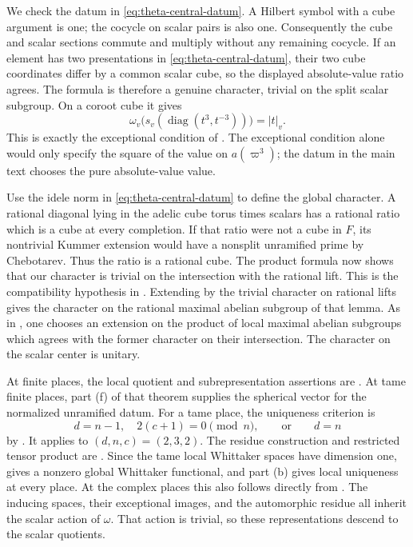 We check the datum in \eqref{eq:theta-central-datum}.  A Hilbert symbol with
a cube argument is one; the cocycle on scalar pairs is also one.  Consequently
the cube and scalar sections commute and multiply without any remaining
cocycle.  If an element has two presentations in
\eqref{eq:theta-central-datum}, their two cube coordinates differ by a
common scalar cube, so the displayed absolute-value ratio agrees.  The
formula is therefore a genuine character, trivial on the split scalar
subgroup.  On a coroot cube it gives
\[
 \omega_v\bigl(s_v(\operatorname{diag}(t^3,t^{-3}))\bigr)=|t|_v.
\]
This is exactly the exceptional condition of
\cite[Section~I.2, p.~71]{KP84}.  The exceptional condition alone would
only specify the square of the value on \(a(\varpi^3)\); the datum in the
main text chooses the pure absolute-value value.

Use the idele norm in \eqref{eq:theta-central-datum} to define the global
character.  A rational diagonal lying in the adelic cube torus times scalars
has a rational ratio which is a cube at every completion.  If that ratio
were not a cube in \(F\), its nontrivial Kummer extension would have a
nonsplit unramified prime by Chebotarev.  Thus the ratio is a rational cube.
The product formula now shows that our character is trivial on the
intersection with the rational lift.  This is the compatibility hypothesis
in \cite[Section~II.1, p.~107, immediately after Lemma~II.1.1]{KP84}.
Extending by the trivial character on rational lifts gives the character
on the rational maximal abelian subgroup of that lemma.  As in
\cite[Section~II.1, pp.~107--109]{KP84}, one chooses an extension on the
product of local maximal abelian subgroups which agrees with the former
character on their intersection.  The character on the scalar center is
unitary.

At finite places, the local quotient and subrepresentation assertions are
\cite[Theorem~I.2.9(a),(b), p.~72]{KP84}.  At tame finite places, part (f)
of that theorem supplies the spherical vector for the normalized unramified
datum.  For a tame place, the uniqueness criterion is
\[
 d=n-1,\quad 2(c+1)=0\pmod n,
 \qquad\text{or}\qquad d=n
\]
by \cite[Corollary~I.3.6, p.~79]{KP84}.  It applies to
\((d,n,c)=(2,3,2)\).  The residue construction and restricted tensor
product are \cite[Theorem~II.2.1, p.~118]{KP84}.  Since the tame local
Whittaker spaces have dimension one,
\cite[Theorem~II.2.5(a), p.~122]{KP84} gives a nonzero global Whittaker
functional, and part (b) gives local uniqueness at every place.
At the complex places this also follows directly from
\cite[Theorem~I.6.5(c), p.~105]{KP84}.  The inducing spaces, their exceptional
images, and the automorphic residue all inherit the scalar action of
\(\omega\).  That action is trivial, so these representations descend to the
scalar quotients.

